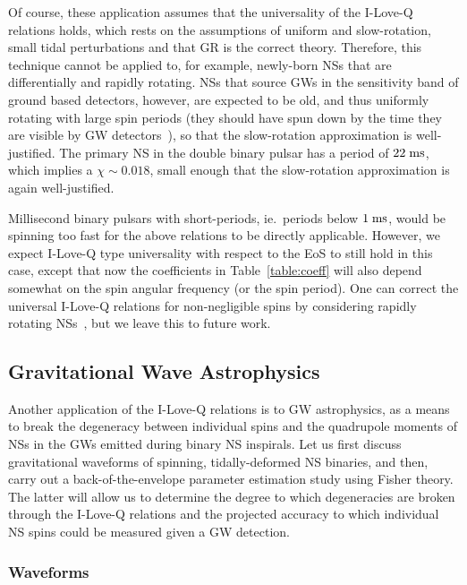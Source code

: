 \documentclass[aps,twocolumn,nofootinbib,showpacs,superscriptaddress,hyperref]{revtex4-1}
\begin{document}
Of course, these application assumes that the universality of the I-Love-Q relations holds, which rests on the assumptions of uniform and slow-rotation, small tidal perturbations and that GR is the correct theory. Therefore, this technique cannot be applied to, for example, newly-born NSs that are differentially and rapidly rotating. NSs that source GWs in the sensitivity band of ground based detectors, however, are expected to be old, and thus uniformly rotating with large spin periods (they should have spun down by the time they are visible by GW detectors~\cite{bildsten-cutler}), so that the slow-rotation approximation is well-justified. The primary NS in the double binary pulsar has a period of $22 \; {\rm{ms}}$, which implies a $\chi \sim 0.018$, small enough that the slow-rotation approximation is again well-justified. 

Millisecond binary pulsars with short-periods, ie.~periods below $1 \; {\rm{ms}}$, would be spinning too fast for the above relations to be directly applicable. However, we expect I-Love-Q type universality with respect to the EoS to still hold in this case, except that now the coefficients in Table~\ref{table:coeff} will also depend somewhat on the spin angular frequency (or the spin period). One can correct the universal I-Love-Q relations for non-negligible spins by considering rapidly rotating NSs~\cite{berti-stergioulas,berti-white,benhar,pappas-apostolatos}, but we leave this to future work.  


\subsection{Gravitational Wave Astrophysics}

Another application of the I-Love-Q relations is to GW astrophysics, as a means to break the degeneracy between individual spins and the quadrupole moments of NSs in the GWs emitted during binary NS inspirals. Let us first discuss gravitational waveforms of spinning, tidally-deformed NS binaries, and then, carry out a back-of-the-envelope parameter estimation study using Fisher theory. The latter will allow us to determine the degree to which degeneracies are broken through the I-Love-Q relations and the projected accuracy to which individual NS spins could be measured given a GW detection. 

\subsubsection{Waveforms}
\end{document}

